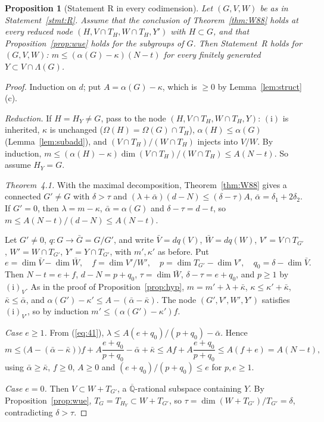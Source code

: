 \documentclass[11pt]{amsart}
\newtheorem{proposition}[theorem]{Proposition}
\theoremstyle{definition}
\newcommand{\Qb}{\overline{\mathbb{Q}}}
\begin{document}
\begin{proposition}[Statement R in every codimension]\label{prop:codim}
Let $(G,V,W)$ be as in Statement~\ref{stmt:R}. Assume that the conclusion of Theorem~\ref{thm:W88} holds at every reduced
node $(H,V\cap T_H,W\cap T_H,Y')$ with $H\subset G$, and that Proposition~\ref{prop:wue} holds for the subgroups of $G$.
Then Statement~R holds for $(G,V,W)$: $m\le(\alpha(G)-\kappa)(N-t)$ for every finitely generated $Y\subset V\cap\Lambda(G)$.
\end{proposition}

\begin{proof}
Induction on $d$; put $A=\alpha(G)-\kappa$, which is $\ge0$ by Lemma~\ref{lem:struct}(c).

\emph{Reduction.} If $H=H_Y\ne G$, pass to the node $(H,V\cap T_H,W\cap T_H,Y)$: $(\mathrm i)$ is inherited, $\kappa$ is
unchanged ($\Omega(H)=\Omega(G)\cap T_H$), $\alpha(H)\le\alpha(G)$ (Lemma~\ref{lem:subadd}), and $(V\cap T_H)/(W\cap T_H)$
injects into $V/W$. By induction, $m\le(\alpha(H)-\kappa)\dim(V\cap T_H)/(W\cap T_H)\le A(N-t)$. So assume $H_Y=G$.

\emph{Theorem~4.1.} With the maximal decomposition, Theorem~\ref{thm:W88} gives a connected $G'\ne G$ with $\delta>\tau$ and
$(\lambda+\bar\alpha)(d-N)\le(\delta-\tau)A$, $\bar\alpha=\delta_1+2\delta_2$. If $G'=0$, then $\lambda=m-\kappa$,
$\bar\alpha=\alpha(G)$ and $\delta-\tau=d-t$, so $m\le A(N-t)/(d-N)\le A(N-t)$.

Let $G'\ne0$, $q\colon G\to\bar G=G/G'$, and write $\bar V=dq(V)$, $\bar W=dq(W)$, $V'=V\cap T_{G'}$, $W'=W\cap T_{G'}$,
$Y'=Y\cap T_{G'}$, with $m',\kappa'$ as before. Put
\[
e=\dim\bar V-\dim\bar W,\quad f=\dim V'/W',\quad p=\dim T_{G'}-\dim V',\quad q_0=\delta-\dim\bar V .
\]
Then $N-t=e+f$, $d-N=p+q_0$, $\tau=\dim\bar W$, $\delta-\tau=e+q_0$, and $p\ge1$ by $(\mathrm i)_V$. As in the proof of
Proposition~\ref{prop:hyp}, $m=m'+\lambda+\bar\kappa$, $\kappa\le\kappa'+\bar\kappa$, $\bar\kappa\le\bar\alpha$, and
$\alpha(G')-\kappa'\le A-(\bar\alpha-\bar\kappa)$. The node $(G',V',W',Y')$ satisfies $(\mathrm i)_{V'}$, so by induction
$m'\le(\alpha(G')-\kappa')f$.

\emph{Case $e\ge1$.} From (\ref{eq:41}), $\lambda\le A(e+q_0)/(p+q_0)-\bar\alpha$. Hence
\[
m\le\bigl(A-(\bar\alpha-\bar\kappa)\bigr)f+A\frac{e+q_0}{p+q_0}-\bar\alpha+\bar\kappa\le Af+A\frac{e+q_0}{p+q_0}\le A(f+e)=A(N-t),
\]
using $\bar\alpha\ge\bar\kappa$, $f\ge0$, $A\ge0$ and $(e+q_0)/(p+q_0)\le e$ for $p,e\ge1$.

\emph{Case $e=0$.} Then $V\subset W+T_{G'}$, a $\Qb$-rational subspace containing $Y$. By Proposition~\ref{prop:wue},
$T_G=T_{H_Y}\subset W+T_{G'}$, so $\tau=\dim(W+T_{G'})/T_{G'}=\delta$, contradicting $\delta>\tau$.
\end{proof}
\end{document}
